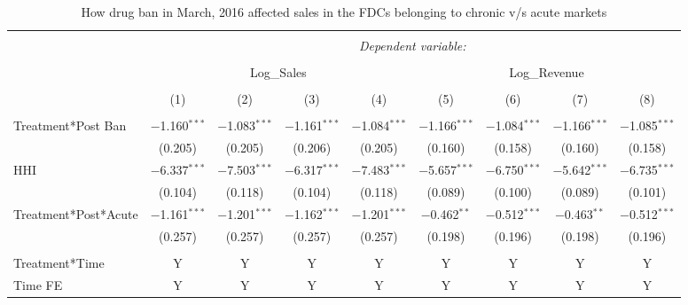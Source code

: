 \documentclass[AER]{AEA}
\theoremstyle{theorem}
\begin{document}
\begin{table}[h!] \centering
	\caption{How drug ban in March, 2016 affected sales in the FDCs belonging to chronic v/s acute markets} 
	\label{Table-R-1} 
	\footnotesize
\begin{tabular}{@{\extracolsep{2pt}}lcccccccc} 
	\\[-1.8ex]\hline 
	\hline \\[-1.8ex] 
	& \multicolumn{8}{c}{\textit{Dependent variable:}} \\ 
	\cline{2-9} 
	\\[-1.8ex] & \multicolumn{4}{c}{Log\_Sales} & \multicolumn{4}{c}{Log\_Revenue} \\ 
	\cline{2-5} \cline{6-9} 
	\\[-1.8ex] & (1) & (2) & (3) & (4) & (5) & (6) & (7) & (8)\\ 
	\hline \\[-1.8ex] 
	Treatment*Post Ban & $-$1.160$^{***}$ & $-$1.083$^{***}$ & $-$1.161$^{***}$ & $-$1.084$^{***}$ & $-$1.166$^{***}$ & $-$1.084$^{***}$ & $-$1.166$^{***}$ & $-$1.085$^{***}$ \\ 
	& (0.205) & (0.205) & (0.206) & (0.205) & (0.160) & (0.158) & (0.160) & (0.158) \\ 
	HHI & $-$6.337$^{***}$ & $-$7.503$^{***}$ & $-$6.317$^{***}$ & $-$7.483$^{***}$ & $-$5.657$^{***}$ & $-$6.750$^{***}$ & $-$5.642$^{***}$ & $-$6.735$^{***}$ \\ 
	& (0.104) & (0.118) & (0.104) & (0.118) & (0.089) & (0.100) & (0.089) & (0.101) \\ 
	Treatment*Post*Acute & $-$1.161$^{***}$ & $-$1.201$^{***}$ & $-$1.162$^{***}$ & $-$1.201$^{***}$ & $-$0.462$^{**}$ & $-$0.512$^{***}$ & $-$0.463$^{**}$ & $-$0.512$^{***}$ \\ 
	& (0.257) & (0.257) & (0.257) & (0.257) & (0.198) & (0.196) & (0.198) & (0.196) \\ 
	\hline \\[-1.8ex] 
	Treatment*Time & Y & Y & Y & Y & Y & Y & Y & Y \\ 
	Time FE & Y & Y & Y & Y & Y & Y & Y & Y \\ 

\end{tabular}
\end{table}
\end{document}
